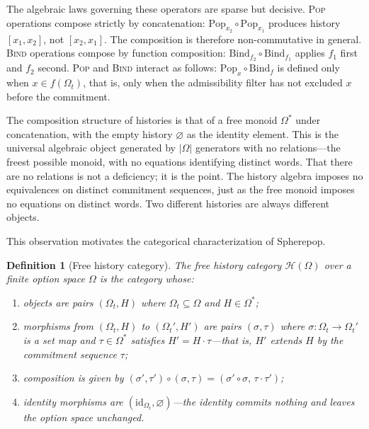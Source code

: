 \documentclass[12pt]{article}
\newtheorem{definition}{Definition}[section]
\begin{document}
The algebraic laws governing these operators are sparse but decisive. \textsc{Pop} operations compose strictly by concatenation: $\mathrm{Pop}_{x_2} \circ \mathrm{Pop}_{x_1}$ produces history $[x_1, x_2]$, not $[x_2, x_1]$. The composition is therefore non-commutative in general. \textsc{Bind} operations compose by function composition: $\mathrm{Bind}_{f_2} \circ \mathrm{Bind}_{f_1}$ applies $f_1$ first and $f_2$ second. \textsc{Pop} and \textsc{Bind} interact as follows: $\mathrm{Pop}_x \circ \mathrm{Bind}_f$ is defined only when $x \in f(\Omega_t)$, that is, only when the admissibility filter has not excluded $x$ before the commitment.

The composition structure of histories is that of a free monoid $\Omega^*$ under concatenation, with the empty history $\varnothing$ as the identity element. This is the universal algebraic object generated by $|\Omega|$ generators with no relations---the freest possible monoid, with no equations identifying distinct words. That there are no relations is not a deficiency; it is the point. The history algebra imposes no equivalences on distinct commitment sequences, just as the free monoid imposes no equations on distinct words. Two different histories are always different objects.

This observation motivates the categorical characterization of Spherepop.

\begin{definition}[Free history category]
\label{def:freehist}
The \emph{free history category} $\mathcal{H}(\Omega)$ over a finite option space $\Omega$ is the category whose:
\begin{enumerate}
\item[(i)] objects are pairs $(\Omega_t, H)$ where $\Omega_t \subseteq \Omega$ and $H \in \Omega^*$;
\item[(ii)] morphisms from $(\Omega_t, H)$ to $(\Omega_t', H')$ are pairs $(\sigma, \tau)$ where $\sigma : \Omega_t \to \Omega_t'$ is a set map and $\tau \in \Omega^*$ satisfies $H' = H \cdot \tau$---that is, $H'$ extends $H$ by the commitment sequence $\tau$;
\item[(iii)] composition is given by $(\sigma', \tau') \circ (\sigma, \tau) = (\sigma' \circ \sigma,\, \tau \cdot \tau')$;
\item[(iv)] identity morphisms are $(\mathrm{id}_{\Omega_t}, \varnothing)$---the identity commits nothing and leaves the option space unchanged.
\end{enumerate}
\end{definition}
\end{document}
